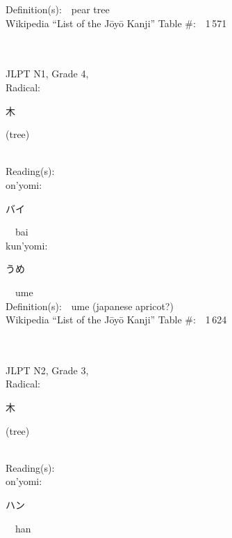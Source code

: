 \begin{multicols}{2}
Definition(s):\ \ pear tree \\
Wikipedia ``List of the J\=oy\=o Kanji'' Table \#:\ \ 1\,571 \\
\ \ \\
{\fontsize{34pt}{40pt}  }\ \ \\  %
{JLPT N1, Grade 4, \\Radical:\ \ {\begin{CJK}{UTF8}{min} 木 \end{CJK}} (tree) } \\
Reading(s):\ \ \\
{\hspace*{1em}}on'yomi:\ \ \\
{\hspace*{2em}}{\begin{CJK}{UTF8}{min} バイ \end{CJK}}\ \ bai\ \ \\
{\hspace*{1em}}kun'yomi:\ \ \\
{\hspace*{2em}}{\begin{CJK}{UTF8}{min} うめ \end{CJK}}\ \ ume\ \ \\
Definition(s):\ \ ume (japanese apricot?) \\
Wikipedia ``List of the J\=oy\=o Kanji'' Table \#:\ \ 1\,624 \\
\ \ \\
{\fontsize{34pt}{40pt}  }\ \ \\  %
{JLPT N2, Grade 3, \\Radical:\ \ {\begin{CJK}{UTF8}{min} 木 \end{CJK}} (tree) } \\
Reading(s):\ \ \\
{\hspace*{1em}}on'yomi:\ \ \\
{\hspace*{2em}}{\begin{CJK}{UTF8}{min} ハン \end{CJK}}\ \ han\ \ \\

\end{multicols}
